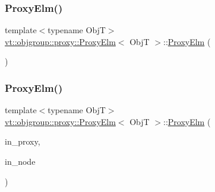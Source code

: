 \mbox{\label{structvt_1_1objgroup_1_1proxy_1_1_proxy_elm_aa3feddfc8142ae38f9436ce3ff86efb7}} 
\subsubsection{\texorpdfstring{Proxy\+Elm()}{ProxyElm()}\hspace{0.1cm}{\footnotesize\ttfamily [3/4]}}
{\footnotesize\ttfamily template$<$typename ObjT$>$ \\
\hyperlink{structvt_1_1objgroup_1_1proxy_1_1_proxy_elm}{vt\+::objgroup\+::proxy\+::\+Proxy\+Elm}$<$ ObjT $>$\+::\hyperlink{structvt_1_1objgroup_1_1proxy_1_1_proxy_elm}{Proxy\+Elm} (\begin{DoxyParamCaption}\item[{\hyperlink{structvt_1_1objgroup_1_1proxy_1_1_proxy_elm}{Proxy\+Elm}$<$ ObjT $>$ \&\&}]{ }\end{DoxyParamCaption})\hspace{0.3cm}{\ttfamily [default]}}

\mbox{\label{structvt_1_1objgroup_1_1proxy_1_1_proxy_elm_a59a010b3f1428a77cb12a9806028f399}} 
\subsubsection{\texorpdfstring{Proxy\+Elm()}{ProxyElm()}\hspace{0.1cm}{\footnotesize\ttfamily [4/4]}}
{\footnotesize\ttfamily template$<$typename ObjT$>$ \\
\hyperlink{structvt_1_1objgroup_1_1proxy_1_1_proxy_elm}{vt\+::objgroup\+::proxy\+::\+Proxy\+Elm}$<$ ObjT $>$\+::\hyperlink{structvt_1_1objgroup_1_1proxy_1_1_proxy_elm}{Proxy\+Elm} (\begin{DoxyParamCaption}\item[{\hyperlink{namespacevt_ad7cae989df485fccca57f0792a880a8e}{Obj\+Group\+Proxy\+Type}}]{in\+\_\+proxy,  }\item[{\hyperlink{namespacevt_a866da9d0efc19c0a1ce79e9e492f47e2}{Node\+Type}}]{in\+\_\+node }\end{DoxyParamCaption})\hspace{0.3cm}{\ttfamily [inline]}}



